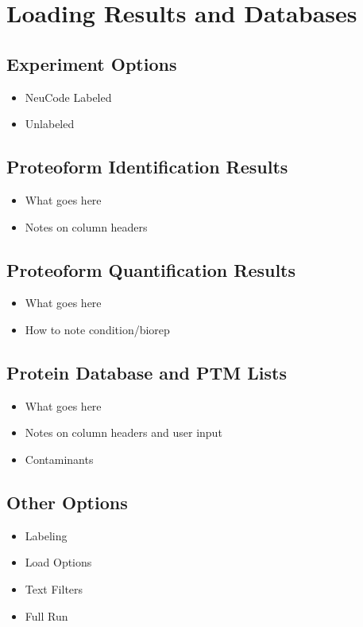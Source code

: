 
\section{Loading Results and Databases}

\subsection{Experiment Options}
\begin{itemize}
	\item NeuCode Labeled
	\item Unlabeled
\end{itemize}

\subsection{Proteoform Identification Results}
\begin{itemize}
	\item What goes here
	\item Notes on column headers
\end{itemize}

\subsection{Proteoform Quantification Results}
\begin{itemize}
	\item What goes here
	\item How to note condition/biorep
\end{itemize}

\subsection{Protein Database and PTM Lists}
\begin{itemize}
	\item What goes here
	\item Notes on column headers and user input
	\item Contaminants
\end{itemize}

\subsection{Other Options}
\begin{itemize}
	\item Labeling
	\item Load Options
	\item Text Filters
	\item Full Run
\end{itemize}
